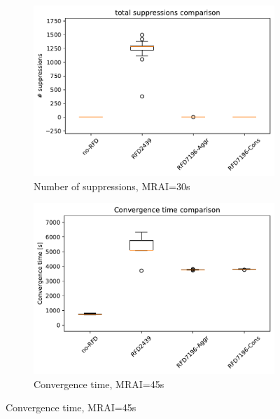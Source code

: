 \begin{figure}[H]
     \hfill
     \begin{subfigure}[b]{0.325\textwidth}
         \centering
         \includegraphics[width=\textwidth]{images/RFD/miceVSelephants/MultiMRAI/30/elephants/cisco_1000MRAI30_rfd_comparison_suppressions_boxplot.pdf}
         \caption{\scriptsize Number of suppressions, MRAI=30s}
         \label{fig:1000_RFD_MRAI30_suppressions_elephant}
     \end{subfigure}
     \vfill
     \begin{subfigure}[b]{0.325\textwidth}
         \centering
         \includegraphics[width=\textwidth]{images/RFD/miceVSelephants/MultiMRAI/45/elephants/cisco_1000MRAI45_rfd_comparison_time_boxplot.pdf}
         \caption{\scriptsize Convergence time, MRAI=45s}
         \label{fig:1000_RFD_MRAI45_time_elephant}
     \end{subfigure}

\end{figure}
